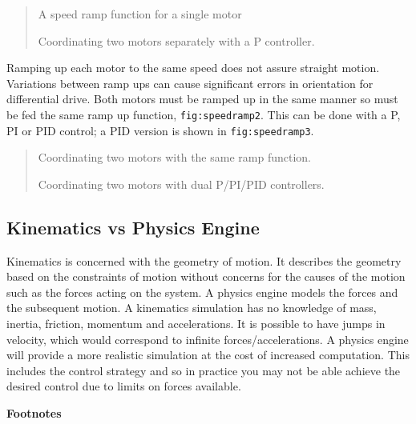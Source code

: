 \begin{quote}
A speed ramp function for a single motor

Coordinating two motors separately with a P controller.
\end{quote}

Ramping up each motor to the same speed does not assure straight motion.
Variations between ramp ups can cause significant errors in orientation
for differential drive. Both motors must be ramped up in the same manner
so must be fed the same ramp up function, \texttt{fig:speedramp2}. This
can be done with a P, PI or PID control; a PID version is shown in
\texttt{fig:speedramp3}.

\begin{quote}
Coordinating two motors with the same ramp function.

Coordinating two motors with dual P/PI/PID controllers.
\end{quote}

\hypertarget{kinematics-vs-physics-engine}{%
\subsection{Kinematics vs Physics
Engine}\label{kinematics-vs-physics-engine}}

Kinematics is concerned with the geometry of motion. It describes the
geometry based on the constraints of motion without concerns for the
causes of the motion such as the forces acting on the system. A physics
engine models the forces and the subsequent motion. A kinematics
simulation has no knowledge of mass, inertia, friction, momentum and
accelerations. It is possible to have jumps in velocity, which would
correspond to infinite forces/accelerations. A physics engine will
provide a more realistic simulation at the cost of increased
computation. This includes the control strategy and so in practice you
may not be able achieve the desired control due to limits on forces
available.

\textbf{Footnotes}
